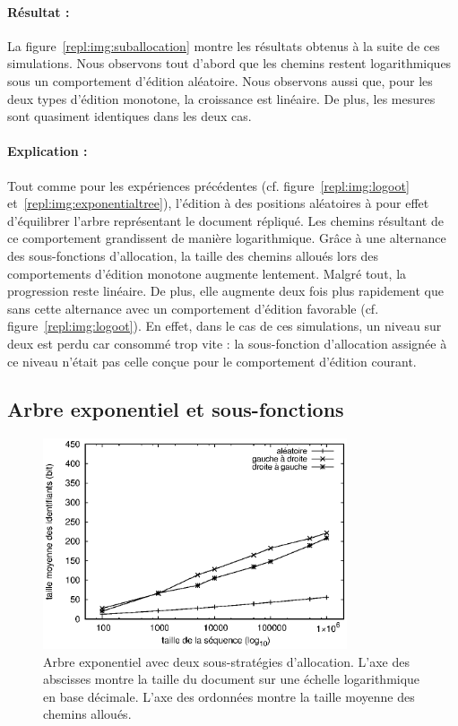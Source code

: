 \paragraph{Résultat :} La figure~\ref{repl:img:suballocation} montre les
résultats obtenus à la suite de ces simulations. Nous observons tout d'abord que
les chemins restent logarithmiques sous un comportement d'édition
aléatoire. Nous observons aussi que, pour les deux types d'édition monotone, la
croissance est linéaire. De plus, les mesures sont quasiment identiques dans les
deux cas.

\paragraph{Explication :} Tout comme pour les expériences précédentes
(cf. figure~\ref{repl:img:logoot} et~\ref{repl:img:exponentialtree}), l'édition
à des positions aléatoires à pour effet d'équilibrer l'arbre représentant le
document répliqué. Les chemins résultant de ce comportement grandissent de
manière logarithmique. Grâce à une alternance des sous-fonctions d'allocation,
la taille des chemins alloués lors des comportements d'édition monotone augmente
lentement. Malgré tout, la progression reste linéaire. De plus, elle augmente
deux fois plus rapidement que sans cette alternance avec un comportement
d'édition favorable (cf. figure~\ref{repl:img:logoot}). En effet, dans le cas de
ces simulations, un niveau sur deux est perdu car consommé trop vite : la
sous-fonction d'allocation assignée à ce niveau n'était pas celle conçue pour le
comportement d'édition courant.


\subsection{Arbre exponentiel et sous-fonctions}

\begin{figure}
  \begin{center}
    \includegraphics[width=0.8\textwidth]{img/lseq/lseq.eps}
    \caption[Combinaison de l'arbre exponentiel et des sous-fonctions
    d'allocation] {\label{repl:img:lseq} Arbre exponentiel avec deux
      sous-stratégies d'allocation. L'axe des abscisses montre la taille du
      document sur une échelle logarithmique en base décimale. L'axe des
      ordonnées montre la taille moyenne des chemins alloués.}
  \end{center}
\end{figure}

